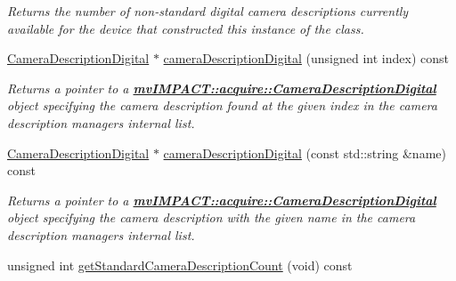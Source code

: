 \begin{DoxyCompactItemize}
\begin{DoxyCompactList}\small\item\em Returns the number of non-\/standard digital camera descriptions currently available for the device that constructed this instance of the class. \end{DoxyCompactList}\item 
\hyperlink{classmv_i_m_p_a_c_t_1_1acquire_1_1_camera_description_digital}{Camera\+Description\+Digital} $\ast$ \hyperlink{classmv_i_m_p_a_c_t_1_1acquire_1_1_camera_description_manager_a7e264a5f9223da75b62c43125262d3dc}{camera\+Description\+Digital} (unsigned int index) const 
\begin{DoxyCompactList}\small\item\em Returns a pointer to a {\bfseries \hyperlink{classmv_i_m_p_a_c_t_1_1acquire_1_1_camera_description_digital}{mv\+I\+M\+P\+A\+C\+T\+::acquire\+::\+Camera\+Description\+Digital}} object specifying the camera description found at the given index in the camera description managers internal list. \end{DoxyCompactList}\item 
\hyperlink{classmv_i_m_p_a_c_t_1_1acquire_1_1_camera_description_digital}{Camera\+Description\+Digital} $\ast$ \hyperlink{classmv_i_m_p_a_c_t_1_1acquire_1_1_camera_description_manager_ab7cf1f226815fc835b71085cb6bea3f2}{camera\+Description\+Digital} (const std\+::string \&name) const 
\begin{DoxyCompactList}\small\item\em Returns a pointer to a {\bfseries \hyperlink{classmv_i_m_p_a_c_t_1_1acquire_1_1_camera_description_digital}{mv\+I\+M\+P\+A\+C\+T\+::acquire\+::\+Camera\+Description\+Digital}} object specifying the camera description with the given name in the camera description managers internal list. \end{DoxyCompactList}\item 
\hypertarget{classmv_i_m_p_a_c_t_1_1acquire_1_1_camera_description_manager_a0e5770c514cea2b84607acb8dd38c933}{unsigned int \hyperlink{classmv_i_m_p_a_c_t_1_1acquire_1_1_camera_description_manager_a0e5770c514cea2b84607acb8dd38c933}{get\+Standard\+Camera\+Description\+Count} (void) const }\label{classmv_i_m_p_a_c_t_1_1acquire_1_1_camera_description_manager_a0e5770c514cea2b84607acb8dd38c933}


\end{DoxyCompactItemize}
